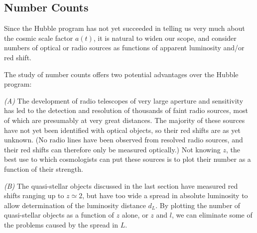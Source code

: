 %

\subsection{Number Counts}\label{sec:14.7}

Since the Hubble program has not yet succeeded in telling us very much about
the cosmic scale factor \(a(t)\), it is natural to widen our scope, and
consider numbers of optical or radio sources as functions of apparent
luminosity and/or red shift.

The study of number counts offers two potential advantages over the Hubble
program:

\medskip
\noindent\textit{(A)}
The development of radio telescopes of very large aperture and sensitivity
has led to the detection and resolution of thousands of faint radio sources,
most of which are presumably at very great distances. The majority of these
sources have not yet been identified with optical objects, so their red
shifts are as yet unknown. (No radio lines have been observed from resolved
radio sources, and their red shifts can therefore only be measured
optically.) Not knowing \(z\), the best use to which cosmologists can put
these sources is to plot their number as a function of their strength.

\medskip
\noindent\textit{(B)}
The quasi-stellar objects discussed in the last section have measured red
shifts ranging up to \(z\simeq2\), but have too wide a spread in absolute
luminosity to allow determination of the luminosity distance \(d_L\). By
plotting the number of quasi-stellar objects as a function of \(z\) alone,
or \(z\) and \(l\), we can eliminate some of the problems caused by the
spread in \(L\).

